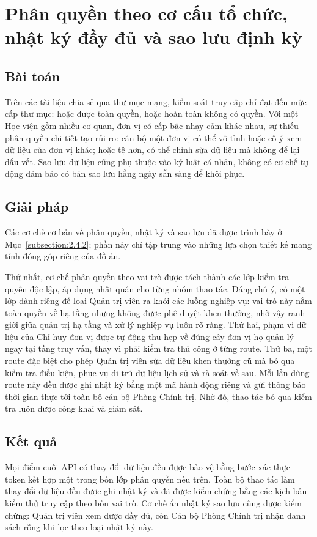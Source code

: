 \documentclass[../DoAn.tex]{subfiles}
\begin{document}
\section{Phân quyền theo cơ cấu tổ chức, nhật ký đầy đủ và sao lưu định kỳ}
\label{section:5.5}

\subsection{Bài toán}
Trên các tài liệu chia sẻ qua thư mục mạng, kiểm soát truy cập chỉ đạt đến mức cấp thư mục: hoặc được toàn quyền, hoặc hoàn toàn không có quyền.
Với một Học viện gồm nhiều cơ quan, đơn vị có cấp bậc nhạy cảm khác nhau, sự thiếu phân quyền chi tiết tạo rủi ro: cán bộ một đơn vị có thể vô tình hoặc cố ý xem dữ liệu của đơn vị khác; hoặc tệ hơn, có thể chỉnh sửa dữ liệu mà không để lại dấu vết.
Sao lưu dữ liệu cũng phụ thuộc vào kỷ luật cá nhân, không có cơ chế tự động đảm bảo có bản sao lưu hằng ngày sẵn sàng để khôi phục.

\subsection{Giải pháp}
Các cơ chế cơ bản về phân quyền, nhật ký và sao lưu đã được trình bày ở Mục~\ref{subsection:2.4.2}; phần này chỉ tập trung vào những lựa chọn thiết kế mang tính đóng góp riêng của đồ án.

Thứ nhất, cơ chế phân quyền theo vai trò được tách thành các lớp kiểm tra quyền độc lập, áp dụng nhất quán cho từng nhóm thao tác.
Đáng chú ý, có một lớp dành riêng để loại Quản trị viên ra khỏi các luồng nghiệp vụ: vai trò này nắm toàn quyền về hạ tầng nhưng không được phê duyệt khen thưởng, nhờ vậy ranh giới giữa quản trị hạ tầng và xử lý nghiệp vụ luôn rõ ràng.
Thứ hai, phạm vi dữ liệu của Chỉ huy đơn vị được tự động thu hẹp về đúng cây đơn vị họ quản lý ngay tại tầng truy vấn, thay vì phải kiểm tra thủ công ở từng route.
Thứ ba, một route đặc biệt cho phép Quản trị viên sửa dữ liệu khen thưởng cũ mà bỏ qua kiểm tra điều kiện, phục vụ di trú dữ liệu lịch sử và rà soát về sau.
Mỗi lần dùng route này đều được ghi nhật ký bằng một mã hành động riêng và gửi thông báo thời gian thực tới toàn bộ cán bộ Phòng Chính trị.
Nhờ đó, thao tác bỏ qua kiểm tra luôn được công khai và giám sát.

\subsection{Kết quả}
Mọi điểm cuối API có thay đổi dữ liệu đều được bảo vệ bằng bước xác thực token kết hợp một trong bốn lớp phân quyền nêu trên.
Toàn bộ thao tác làm thay đổi dữ liệu đều được ghi nhật ký và đã được kiểm chứng bằng các kịch bản kiểm thử truy cập theo bốn vai trò.
Cơ chế ẩn nhật ký sao lưu cũng được kiểm chứng: Quản trị viên xem được đầy đủ, còn Cán bộ Phòng Chính trị nhận danh sách rỗng khi lọc theo loại nhật ký này.
\end{document}
